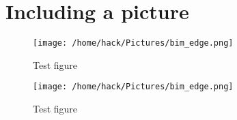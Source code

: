 \documentclass[a5paper]{article}
\begin{document}
\section{Including a picture}
\blindtext
\begin{figure}[ht]
  \centering
  \texttt{[image: /home/hack/Pictures/bim\_edge.png]}
  \caption{Test figure}
\end{figure}
\begin{figure}[!b]
  \centering
  \texttt{[image: /home/hack/Pictures/bim\_edge.png]}
  \caption{Test figure}
\end{figure}
\blindtext
\end{document}
